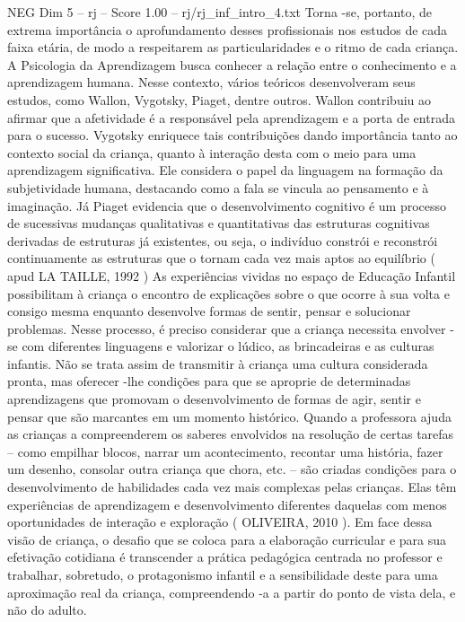\begin{textsample}{NEG Dim 5 – rj – Score 1.00 – rj/rj\_inf\_intro\_4.txt}
Torna -se, portanto, de extrema importância o aprofundamento desses profissionais nos estudos de cada faixa etária, de modo a respeitarem as particularidades e o ritmo de cada criança.
A Psicologia da Aprendizagem busca conhecer a relação entre o conhecimento e a aprendizagem humana.
Nesse contexto, vários teóricos desenvolveram seus estudos, como Wallon, Vygotsky, Piaget, dentre outros.
Wallon contribuiu ao afirmar que a afetividade é a responsável pela aprendizagem e a porta de entrada para o sucesso.
Vygotsky enriquece tais contribuições dando importância tanto ao contexto social da criança, quanto à interação desta com o meio para uma aprendizagem significativa.
Ele considera o papel da linguagem na formação da subjetividade humana, destacando como a fala se vincula ao pensamento e à imaginação.
Já Piaget evidencia que o desenvolvimento cognitivo é um processo de sucessivas mudanças qualitativas e quantitativas das estruturas cognitivas derivadas de estruturas já existentes, ou seja, o indivíduo constrói e reconstrói continuamente as estruturas que o tornam cada vez mais aptos ao equilíbrio ( apud LA TAILLE, 1992 ) As experiências vividas no espaço de Educação Infantil possibilitam à criança o encontro de explicações sobre o que ocorre à sua volta e consigo mesma enquanto desenvolve formas de sentir, pensar e solucionar problemas.
Nesse processo, é preciso considerar que a criança necessita envolver -se com diferentes linguagens e valorizar o lúdico, as brincadeiras e as culturas infantis.
Não se trata assim de transmitir à criança uma cultura considerada pronta, mas oferecer -lhe condições para que se aproprie de determinadas aprendizagens que promovam o desenvolvimento de formas de agir, sentir e pensar que são marcantes em um momento histórico.
Quando a professora ajuda as crianças a compreenderem os saberes envolvidos na resolução de certas tarefas – como empilhar blocos, narrar um acontecimento, recontar uma história, fazer um desenho, consolar outra criança que chora, etc. – são criadas condições para o desenvolvimento de habilidades cada vez mais complexas pelas crianças.
Elas têm experiências de aprendizagem e desenvolvimento diferentes daquelas com menos oportunidades de interação e exploração ( OLIVEIRA, 2010 ).
Em face dessa visão de criança, o desafio que se coloca para a elaboração curricular e para sua efetivação cotidiana é transcender a prática pedagógica centrada no professor e trabalhar, sobretudo, o protagonismo infantil e a sensibilidade deste para uma aproximação real da criança, compreendendo -a a partir do ponto de vista dela, e não do adulto.

\end{textsample}
